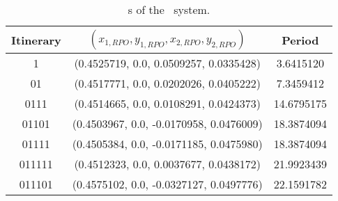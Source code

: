 \begin{table}
	\begin{tabular}{c|c|c}
	Itinerary & $(x_{1,RPO}, y_{1,RPO}, x_{2,RPO}, y_{2,RPO})$ & Period \\ 
	\hline
	1 & (0.4525719,   0.0, 0.0509257, 0.0335428) & 3.6415120 \\ 
 	\hline
	01 & (0.4517771,   0.0, 0.0202026, 0.0405222) & 7.3459412 \\ 
 	\hline
	0111 & (0.4514665,   0.0, 0.0108291, 0.0424373) & 14.6795175 \\ 
 	\hline
	01101 & (0.4503967,   0.0, -0.0170958, 0.0476009) & 18.3874094 \\ 
 	\hline
	01111 & (0.4505384,   0.0, -0.0171185, 0.0475980) & 18.3874094 \\ 
 	\hline
	011111 & (0.4512323,   0.0, 0.0037677, 0.0438172) & 21.9923439 \\ 
 	\hline
	011101 & (0.4575102,   0.0, -0.0327127, 0.0497776) & 22.1591782 \\ 
 	\end{tabular}
	\caption{\Rpo s of the \twoMode\ system.}
	\label{tab:twomoderpos}
\end{table}
